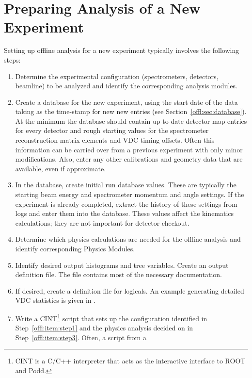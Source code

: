 {{\section{Preparing Analysis of a New Experiment}
\label{offl:sec:newexpt}
Setting up offline analysis for a new experiment typically
involves the following steps:
\begin{enumerate}
  \item Determine the experimental configuration (spectrometers,
        detectors, beamline) to be analyzed and identify the corresponding
	analysis modules. \label{offl:item:step1}
  \item Create a database for the new experiment, using the
        start date of the data taking as the time-stamp for new
	new entries (see Section~\ref{offl:sec:database}).
	At the minimum the database should contain up-to-date
	detector map entries for every detector and rough starting
	values for the spectrometer reconstruction matrix elements
	and VDC timing offsets. Often this information can be
	carried over from a previous experiment with only minor
	modifications. Also, enter any other calibrations and geometry
	data that are available, even if approximate.
  \item In the database, create initial run database values.
        These are typically the starting beam energy and spectrometer
	momentum and angle settings. If the experiment is already completed,
	extract the history of these settings from logs and enter them
	into the database. These values affect the kinematics calculations;
	they are not important for detector checkout.
  \item Determine which physics calculations are needed for the
        offline analysis and identify corresponding Physics Modules.
	\label{offl:item:step3}
  \item Identify desired output histograms and tree variables.
        Create an output definition file. The file
         contains
	most of the necessary documentation.
  \item If desired, create a definition file for logicals.
        An example generating detailed VDC statistics is
	given in .
  \item Write a CINT\footnote{CINT is a C/C++ interpreter that acts
        as the interactive interface to ROOT and Podd.}
        script that sets up the configuration identified in
	Step~\ref{offl:item:step1} and the physics analysis decided on
	in Step~\ref{offl:item:step3}. Often, a script from a

\end{enumerate}}}
